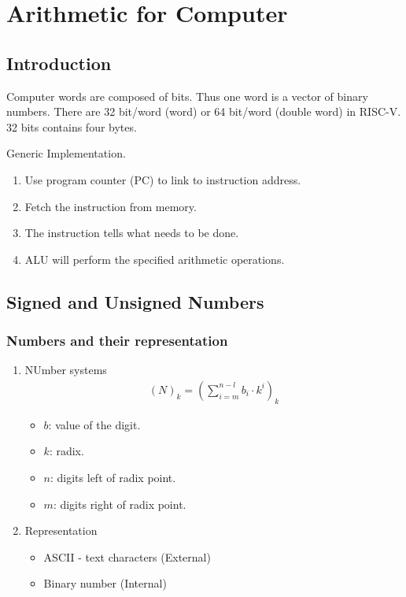 \newpage
\section{Arithmetic for Computer}

\subsection{Introduction}

Computer words are composed of bits. Thus one word is a vector of binary numbers. There are 32 bit/word (word) or 64 bit/word (double word) in RISC-V. 32 bits contains four bytes. 

Generic Implementation. 
\begin{enumerate}
    \item Use program counter (PC) to link to instruction address. 
    \item Fetch the instruction from memory. 
    \item The instruction tells what needs to be done. 
    \item ALU will perform the specified arithmetic operations.
\end{enumerate}

\subsection{Signed and Unsigned Numbers}

\subsubsection{Numbers and their representation}
\begin{enumerate}
    \item NUmber systems
    \begin{align*}
        (N)_k=\left( \sum_{i=m}^{n-l} b_i \cdot k^i \right)_k
    \end{align*}
    \begin{itemize}
        \item $b$: value of the digit. 
        \item $k$: radix.
        \item $n$: digits left of radix point.
        \item $m$: digits right of radix point.
    \end{itemize}
    \item Representation
    \begin{itemize}
        \item ASCII - text characters (External)
        \item Binary number (Internal)
    \end{itemize}
\end{enumerate}


